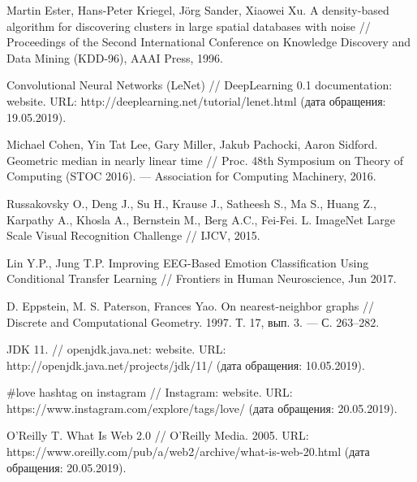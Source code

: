 \begingroup 
\renewcommand{\section}[2]{\anonsection{Библиографический список}}
\begin{thebibliography}{00}

    Martin Ester, Hans-Peter Kriegel, Jörg Sander, Xiaowei Xu.
    A density-based algorithm for discovering clusters in large spatial databases with noise // 
    Proceedings of the Second International Conference on Knowledge Discovery and Data Mining (KDD-96),
    AAAI Press, 
    1996.

    Convolutional Neural Networks (LeNet) // 
    DeepLearning 0.1 documentation: website. 
    URL: http://deeplearning.net/tutorial/lenet.html 
    (дата обращения: 19.05.2019).

    Michael Cohen, Yin Tat Lee, Gary Miller, Jakub Pachocki, Aaron Sidford. 
    Geometric median in nearly linear time // 
    Proc. 48th Symposium on Theory of Computing (STOC 2016). — Association for Computing Machinery, 
    2016.

    Russakovsky O., Deng J., Su H., Krause J., Satheesh S., Ma S., Huang Z., Karpathy A., Khosla A., Bernstein M., Berg A.C., Fei-Fei. L. 
    ImageNet Large Scale Visual Recognition Challenge // 
    IJCV, 
    2015.

    Lin Y.P., Jung T.P.
    Improving EEG-Based Emotion Classification Using Conditional Transfer Learning //
    Frontiers in Human Neuroscience, 
    Jun 2017.

    D. Eppstein, M. S. Paterson, Frances Yao. 
    On nearest-neighbor graphs // 
    Discrete and Computational Geometry. 
    1997. Т. 17, вып. 3. — С. 263–282.

    JDK 11. // 
    openjdk.java.net: website. 
    URL: http://openjdk.java.net/projects/jdk/11/
    (дата обращения: 10.05.2019).

    \#love hashtag on instagram // 
    Instagram: website. 
    URL: https://www.instagram.com/explore/tags/love/ 
    (дата обращения: 20.05.2019).

    O'Reilly T. What Is Web 2.0 // 
    O’Reilly Media. 
    2005. 
    URL: https://www.oreilly.com/pub/a/web2/archive/what-is-web-20.html 
    (дата обращения: 20.05.2019).


\end{thebibliography}
